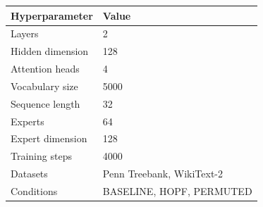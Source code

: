 \begin{tabular}{ll}
\toprule
Hyperparameter & Value \\
\midrule
Layers & 2 \\
Hidden dimension & 128 \\
Attention heads & 4 \\
Vocabulary size & 5000 \\
Sequence length & 32 \\
Experts & 64 \\
Expert dimension & 128 \\
Training steps & 4000 \\
Datasets & Penn Treebank, WikiText-2 \\
Conditions & BASELINE, HOPF, PERMUTED \\
\bottomrule
\end{tabular}
